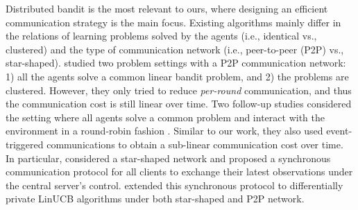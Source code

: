 Distributed bandit
\citep{korda2016distributed,wang2019distributed,dubey2020differentially} is the most relevant to ours, where designing an efficient communication strategy is the main focus. Existing algorithms mainly differ in the relations of learning problems solved by the agents (i.e., identical vs., clustered) and the type of communication network (i.e., peer-to-peer (P2P) vs., star-shaped). \citet{korda2016distributed} studied two problem settings with a P2P communication network: 1) all the agents solve a common linear bandit problem, and 2) the problems are clustered. However, they only tried to reduce \textit{per-round} communication, and thus the communication cost is still linear over time.
Two follow-up studies considered the setting where all agents solve a common problem and interact with the environment in a round-robin fashion \citep{wang2019distributed,dubey2020differentially}. Similar to our work, they also used event-triggered communications to obtain a sub-linear communication cost over time.
In particular, \citet{wang2019distributed} considered a star-shaped network and proposed a synchronous communication protocol for all clients to exchange their latest observations under the central server's control. 
\citet{dubey2020differentially} extended this synchronous protocol to differentially private LinUCB algorithms under both star-shaped and P2P network.

